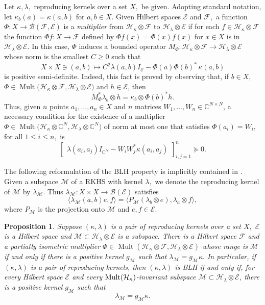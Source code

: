 \documentclass[a4paper,reqno,index]{amsart}
\newcommand{\df}[1]{{\textit{#1}}{\index{#1}}}
\numberwithin{equation}{section}
\newcommand{\Mult}{\operatorname{Mult}}
\newcommand{\cB}{\mathcal{B}}
\newcommand{\cM}{\mathcal{M}}
\newcommand{\cH}{\mathcal{H}}
\newcommand{\HSF}{\mathcal{F}}
\newcommand{\HSE}{\mathcal{E}}
\newcommand{\genk}{\kappa} %
\newcommand{\genl}{\lambda} %
\newtheorem{proposition}[theorem]{Proposition}
\theoremstyle{definition}
\begin{document}
  Let $\genk,\genl,$ reproducing kernels over a set $X,$ be given.
  Adopting standard notation, let $\genk_b(a) = \genk(a,b)$ for $a,b\in X.$ 
   Given Hilbert spaces $\HSE$ and $\HSF,$
 a function $\Phi:X\to \cB(\HSF,\HSE)$ is a \df{multiplier} from $\cH_\genk \otimes \HSF$ to  $\cH_\genl\otimes \HSE$
 if for each $f\in \cH_\genk\otimes \HSF$ the function $\Phi f: X\to \HSF$ defined by $\Phi f(x)=\Phi(x) f(x)$ for $x\in X$ is in $\cH_\genl\otimes \HSE.$
 In this case, $\Phi$ induces a bounded operator  $M_\Phi:\cH_\genk \otimes \HSF \to \cH_\genl\otimes \HSE$  whose norm is
 the smallest $C\ge 0$ such that
 \[
  X \times X \ni (a,b) \mapsto C^2\genl(a,b)I_{\HSE} -\Phi(a)\Phi(b)^* \, \genk(a,b)
 \]
  is positive semi-definite. Indeed, this fact is proved by observing that, if $b\in X,$ $\Phi\in  \Mult\big(\mathcal{H}_{\genk}\otimes \HSF,\mathcal{H}_{\genl}\otimes \HSE\big)$ and $h\in \HSE$, then \[M_\Phi^* \genl_b\otimes h= \genk_b\otimes \Phi(b)^*h.\]
 Thus, given  $n$ points $a_1, \dots, a_n\in X$ and $n$ matrices $W_1, \dots, W_n\in \mathbb{C}^{N\times N}$,  a necessary condition for the existence of a multiplier $\Phi \in\Mult\big(\mathcal{H}_{\genk}\otimes\mathbb{C}^N, \mathcal{H}_{\genl}\otimes \mathbb{C}^N\big)$ of norm at most one that satisfies $\Phi(a_i)=W_i,$ for all $1\le i\le n,$ is  
\begin{equation} \label{multinterpol} 
 \begin{bmatrix}\genl(a_i, a_j)I_{\mathbb{C}^N}-W_iW^*_j\genk(a_i, a_j) \end{bmatrix}_{i,j=1}^n\succeq 0.
\end{equation}

The following reformulation of the BLH property is implicitly contained in \cite{Beurlingfactor}. Given a   subspace $\cM$ of a RKHS with kernel $\genl,$ we denote the reproducing kernel of $\cM$ by \df{$\genl_\cM$}.  
Thus $\genl_{\cM}: X\times X \to \cB(\HSE)$ satisfies
\[
 \langle \genl_{\cM}(a,b) e,f \rangle 
  =  \langle P_{\cM} (\genl_b \otimes e), \genl_a\otimes f
   \rangle,
\]
 where $P_{\cM}$ is the projection onto $\cM$ and
 $e,f\in\HSE.$


\begin{proposition}\label{l_m/k}
 Suppose $(\genk,\genl)$ is a pair of reproducing kernels
over a set $X,$  $\HSE$ is a Hilbert space and 
$\cM\subset \cH_{\genl}\otimes \HSE$ is a subspace.  There is a Hilbert space $\HSF$ and a partially
isometric multiplier $\Phi\in \Mult(\cH_\genk\otimes \HSF,\cH_\genl \otimes \HSE)$ whose range is $\cM$ if and only if there is 
a positive kernel $g_{\cM}$ such that $\genl_{\cM} = g_{\cM} \genk.$ In particular,
if  $(\genk, \genl)$ is a pair of reproducing kernels, then  $(\genk, \genl)$ is BLH if and only if,  for every Hilbert space $\mathcal{E}$ and every 
$\textup{Mult}(\mathcal{H}_{\genk})$-invariant   subspace  $\mathcal{M}\subset \mathcal{H}_{\genl}\otimes\mathcal{E}$,
 there is a positive kernel $g_\cM$ such that 
\[
 \genl_{\cM} = g_{\cM} \genk.
\]
\end{proposition}
\end{document}
